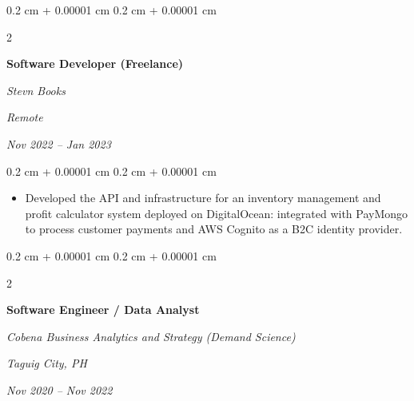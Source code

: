 \documentclass[10pt, a4paper]{article}
\newenvironment{highlights}{
    \begin{itemize}[
        topsep=0.10 cm,
        parsep=0.10 cm,
        partopsep=0pt,
        itemsep=0pt,
        leftmargin=0.4 cm + 10pt
    ]
}{
    \end{itemize}
} %
\newenvironment{onecolentry}{
    \begin{adjustwidth}{
        0.2 cm + 0.00001 cm
    }{
        0.2 cm + 0.00001 cm
    }
}{
    \end{adjustwidth}
} %
\newenvironment{twocolentry}[2][]{
    \onecolentry
    \def\secondColumn{#2}
    \setcolumnwidth{\fill, 4.5 cm}
    \begin{paracol}{2}
}{
    \switchcolumn \raggedleft \secondColumn
    \end{paracol}
    \endonecolentry
} %
\begin{document}
        \vspace{0.2 cm}

        \begin{twocolentry}{
        \textit{Remote}    
            
        \textit{Nov 2022 – Jan 2023}}
            \textbf{Software Developer (Freelance)}
            
            \textit{Stevn Books}
        \end{twocolentry}

        \vspace{0.10 cm}
        \begin{onecolentry}
            \begin{highlights}
                \item Developed the API and infrastructure for an inventory management and profit calculator system deployed on DigitalOcean: integrated with PayMongo to process customer payments and AWS Cognito as a B2C identity provider.

            \end{highlights}
        \end{onecolentry}


        \vspace{0.2 cm}

        \begin{twocolentry}{
        \textit{Taguig City, PH}    
            
        \textit{Nov 2020 – Nov 2022}}
            \textbf{Software Engineer / Data Analyst}
            
            \textit{Cobena Business Analytics and Strategy (Demand Science)}
        \end{twocolentry}
\end{document}
